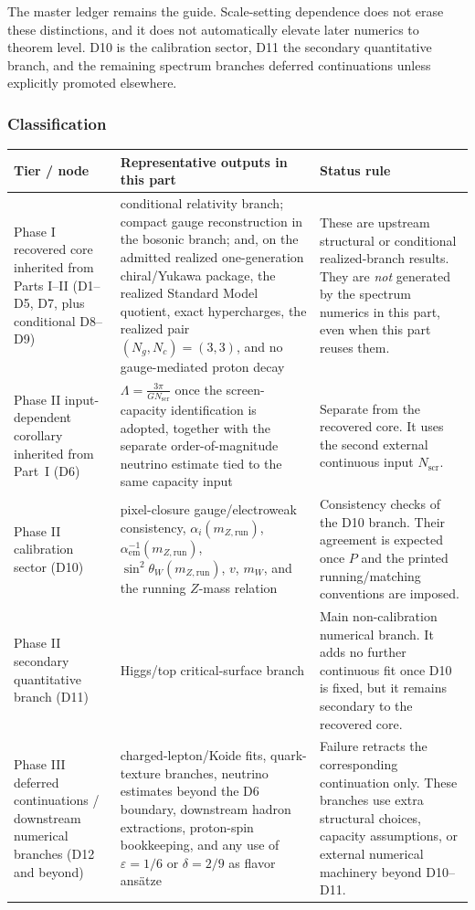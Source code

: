The master ledger remains the guide. Scale-setting dependence does not erase these distinctions, and it does not automatically elevate later numerics to theorem level. D10 is the calibration sector, D11 the secondary quantitative branch, and the remaining spectrum branches deferred continuations unless explicitly promoted elsewhere.

\subsubsection{Classification}\label{1b3-classification}

{\footnotesize
\def\LTcaptype{none}
\begin{longtable}[]{@{}>{\RaggedRight\arraybackslash}p{}>{\RaggedRight\arraybackslash}p{}>{\RaggedRight\arraybackslash}p{}@{}}
\toprule
Tier / node & Representative outputs in this part & Status rule \\
\midrule
\endhead
\bottomrule
\endfoot
Phase I recovered core inherited from Parts I--II (D1--D5, D7, plus conditional D8--D9) & conditional relativity branch; compact gauge reconstruction in the bosonic branch; and, on the admitted realized one-generation chiral/Yukawa package, the realized Standard Model quotient, exact hypercharges, the realized pair \((N_g,N_c)=(3,3)\), and no gauge-mediated proton decay & These are upstream structural or conditional realized-branch results. They are \emph{not} generated by the spectrum numerics in this part, even when this part reuses them. \\
Phase II input-dependent corollary inherited from Part~I (D6) & \(\Lambda=\frac{3\pi}{G N_{\mathrm{scr}}}\) once the screen-capacity identification is adopted, together with the separate order-of-magnitude neutrino estimate tied to the same capacity input & Separate from the recovered core. It uses the second external continuous input \(N_{\mathrm{scr}}\). \\
Phase II calibration sector (D10) & pixel-closure gauge/electroweak consistency, \(\alpha_i(m_{Z,\text{run}})\), \(\alpha_{\mathrm{em}}^{-1}(m_{Z,\text{run}})\), \(\sin^2\theta_W(m_{Z,\text{run}})\), \(v\), \(m_W\), and the running \(Z\)-mass relation & Consistency checks of the D10 branch. Their agreement is expected once \(P\) and the printed running/matching conventions are imposed. \\
Phase II secondary quantitative branch (D11) & Higgs/top critical-surface branch & Main non-calibration numerical branch. It adds no further continuous fit once D10 is fixed, but it remains secondary to the recovered core. \\
Phase III deferred continuations / downstream numerical branches (D12 and beyond) & charged-lepton/Koide fits, quark-texture branches, neutrino estimates beyond the D6 boundary, downstream hadron extractions, proton-spin bookkeeping, and any use of \(\varepsilon=1/6\) or \(\delta=2/9\) as flavor ans\"atze & Failure retracts the corresponding continuation only. These branches use extra structural choices, capacity assumptions, or external numerical machinery beyond D10--D11. \\
\end{longtable}
}

